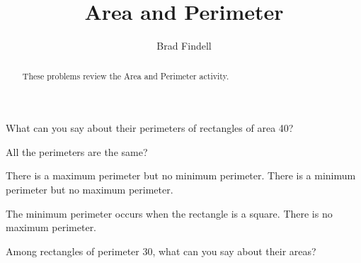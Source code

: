 \documentclass[nooutcomes]{ximera}
\title{Area and Perimeter}
\author{Brad Findell}
\begin{document}
\begin{abstract}
These problems review the Area and Perimeter activity.  
\end{abstract}
\maketitle

What can you say about their perimeters of rectangles of area 40?   

All the perimeters are the same?  

There is a maximum perimeter but no minimum perimeter.  
There is a minimum perimeter but no maximum perimeter. 

The minimum perimeter occurs when the rectangle is a square.  
There is no maximum perimeter.  

Among rectangles of perimeter 30, what can you say about their areas?  
\end{document}
